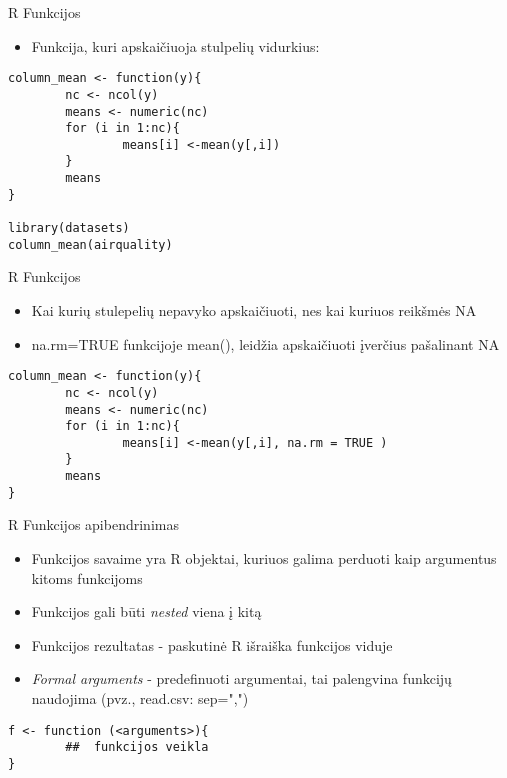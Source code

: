 \documentclass[11pt,xcolor=table]{beamer}
\begin{document}
\begin{frame}[fragile]{R Funkcijos}
\begin{itemize}
\item Funkcija, kuri apskaičiuoja stulpelių vidurkius:
\end{itemize}
\begin{lstlisting}
column_mean <- function(y){
        nc <- ncol(y)
        means <- numeric(nc)
        for (i in 1:nc){
                means[i] <-mean(y[,i])
        }
        means
}

library(datasets)
column_mean(airquality)
\end{lstlisting}
\end{frame}


\begin{frame}[fragile]{R Funkcijos}
\begin{itemize}
\item Kai kurių stulepelių nepavyko apskaičiuoti, nes kai kuriuos reikšmės NA
\item na.rm=TRUE funkcijoje mean(), leidžia apskaičiuoti įverčius pašalinant NA
\end{itemize}
\begin{lstlisting}
column_mean <- function(y){
        nc <- ncol(y)
        means <- numeric(nc)
        for (i in 1:nc){
                means[i] <-mean(y[,i], na.rm = TRUE )
        }
        means
}
\end{lstlisting}
\end{frame}


\begin{frame}[fragile]{R Funkcijos apibendrinimas}
\begin{itemize}
\item Funkcijos savaime yra R objektai, kuriuos galima perduoti kaip argumentus kitoms funkcijoms
\item Funkcijos gali būti \textit{nested} viena į kitą
\item Funkcijos rezultatas - paskutinė R išraiška funkcijos viduje
\item \textit{Formal arguments} - predefinuoti argumentai, tai palengvina funkcijų naudojima (pvz., read.csv: sep=",")

\end{itemize}
\begin{lstlisting}
f <- function (<arguments>){
		##  funkcijos veikla
}
\end{lstlisting}
\end{frame}
\end{document}
